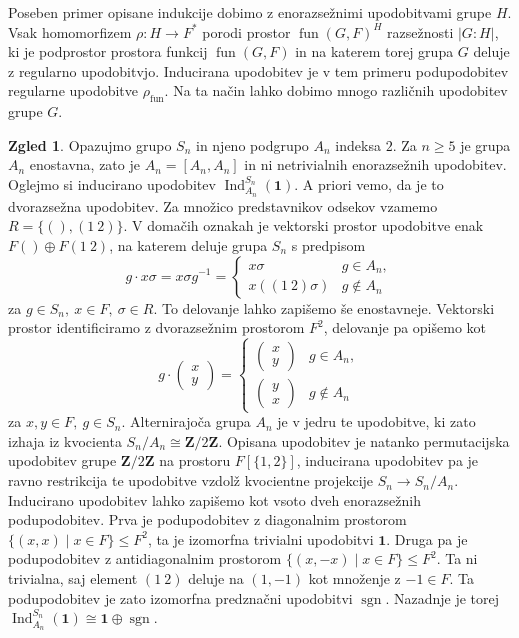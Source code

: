 \documentclass[11pt]{book}
\def\ZZ{\mathbf{Z}}
\def\11{\mathbf{1}}
\DeclareMathOperator\sgn{sgn}
\DeclareMathOperator\Ind{Ind}
\DeclareMathOperator\fun{fun}
\theoremstyle{definition}
\theoremstyle{zgled}
\newtheorem*{zgled}{Zgled}
\theoremstyle{odprtproblem}
\theoremstyle{domacanaloga}
\theoremstyle{izrek}
\begin{document}
Poseben primer opisane indukcije dobimo z enorazsežnimi upodobitvami grupe $H$. Vsak homomorfizem $\rho \colon H \to F^*$ porodi prostor $\fun(G,F)^H$ razsežnosti $|G:H|$, ki je podprostor prostora funkcij $\fun(G,F)$ in na katerem torej grupa $G$ deluje z regularno upodobitvjo. Inducirana upodobitev je v tem primeru podupodobitev regularne upodobitve $\rho_{\fun}$. Na ta način lahko dobimo mnogo različnih upodobitev grupe $G$.

\begin{zgled}
    Opazujmo grupo $S_n$ in njeno podgrupo $A_n$ indeksa $2$. Za $n \geq 5$ je grupa $A_n$ enostavna, zato je $A_n = [A_n, A_n]$ in ni netrivialnih enorazsežnih upodobitev. Oglejmo si inducirano upodobitev $\Ind^{S_n}_{A_n}(\11)$. A priori vemo, da je to dvorazsežna upodobitev. Za množico predstavnikov odsekov vzamemo $R = \{ (), (1 \ 2) \}$. V domačih oznakah je vektorski prostor upodobitve enak $F ()\oplus F (1 \ 2)$, na katerem deluje grupa $S_n$ s predpisom
    \[
        g \cdot x \sigma = x \sigma g^{-1} = \begin{cases}
            x \sigma   & g \in A_n, \\
            x \left((1 \ 2)\sigma\right)    & g \notin A_n
        \end{cases}
    \]
    za $g \in S_n, \ x \in F, \ \sigma \in R$. To delovanje lahko zapišemo še enostavneje. Vektorski prostor identificiramo z dvorazsežnim prostorom $F^2$, delovanje pa opišemo kot
    \[
        g \cdot \begin{pmatrix}
            x \\ y
        \end{pmatrix} =
        \begin{cases}
            \begin{pmatrix}
                x \\ y
            \end{pmatrix} & g \in A_n, \\
            \begin{pmatrix}
                y \\ x
            \end{pmatrix} & g \notin A_n
        \end{cases}
    \]
    za $x,y \in F, \ g \in S_n$. Alternirajoča grupa $A_n$ je v jedru te upodobitve, ki zato izhaja iz kvocienta $S_n/A_n \cong \ZZ/2\ZZ$. Opisana upodobitev je natanko permutacijska upodobitev grupe $\ZZ/2\ZZ$ na prostoru $F[\{ 1, 2 \}]$, inducirana upodobitev pa je ravno restrikcija te upodobitve vzdolž kvocientne projekcije $S_n \to S_n/A_n$. Inducirano upodobitev lahko zapišemo kot vsoto dveh enorazsežnih podupodobitev. Prva je podupodobitev z diagonalnim prostorom $\{ (x,x) \mid x \in F \} \leq F^2$, ta je izomorfna trivialni upodobitvi $\11$. Druga pa je podupodobitev z antidiagonalnim prostorom $\{ (x, -x) \mid x \in F \} \leq F^2$. Ta ni trivialna, saj element $(1 \ 2)$ deluje na $(1, -1)$ kot množenje z $-1 \in F$. Ta podupodobitev je zato izomorfna predznačni upodobitvi $\sgn$. Nazadnje je torej $\Ind^{S_n}_{A_n}(\11) \cong \11 \oplus \sgn$.
\end{zgled}
\end{document}
